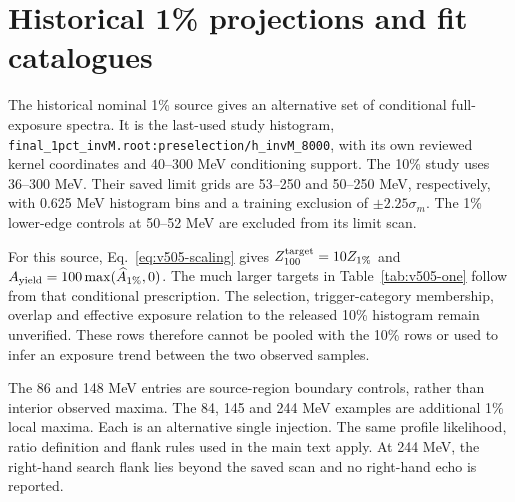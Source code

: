 \section{Historical 1\% projections and fit catalogues}
\label{app:v505-one}
The historical nominal 1\% source gives an alternative set of conditional
full-exposure spectra. It is the last-used study histogram,
\texttt{final\_1pct\_invM.root:preselection/h\_invM\_8000}, with its own
reviewed kernel coordinates and 40--300 MeV conditioning support. The
10\% study uses 36--300 MeV. Their saved limit grids are 53--250 and
50--250 MeV, respectively, with 0.625 MeV histogram bins and a training
exclusion of $\pm2.25\sigma_m$. The 1\% lower-edge controls at 50--52 MeV
are excluded from its limit scan.

For this source, Eq.~\eqref{eq:v505-scaling} gives
$Z_{100}^{\rm target}=10Z_{1\%}$ and
$A_{\rm yield}=100\max(\widehat A_{1\%},0)$. The much larger targets in
Table~\ref{tab:v505-one} follow from that conditional prescription. The
selection, trigger-category membership, overlap and effective exposure
relation to the released 10\% histogram remain unverified. These rows
therefore cannot be pooled with the 10\% rows or used to infer an exposure
trend between the two observed samples.


The 86 and 148 MeV entries are source-region boundary controls, rather than
interior observed maxima. The 84, 145 and 244 MeV examples are additional
1\% local maxima. Each is an alternative single injection. The same profile
likelihood, ratio definition and flank rules used in the main text apply.
At 244 MeV, the right-hand search flank lies beyond the saved scan and no
right-hand echo is reported.

